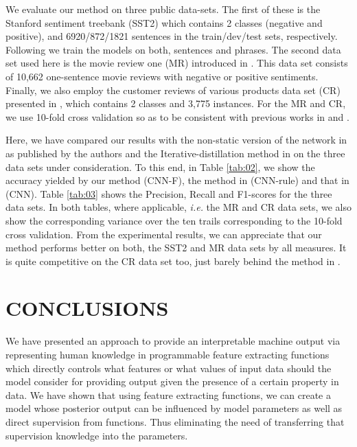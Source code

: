 \documentclass[12pt,a4paper]{article}
\begin{document}
\newpage
We evaluate our method on three public data-sets. The first of these is the Stanford sentiment treebank (SST2) \cite{Socher:2014} which contains 2 classes (negative and positive), and 6920/872/1821 sentences in the train/dev/test sets, respectively. Following \cite{Kim:2014} we train the models on both, sentences and phrases. The second data set used here is the movie review one (MR) introduced in \cite{Pang-Lee:2005}. This data set consists of 10,662 one-sentence movie reviews with negative or positive sentiments. Finally, we also employ the customer reviews of various products data set (CR) presented in \cite{Hu-and-Liu:2004}, which contains 2 classes and 3,775 instances.  For the MR and CR, we use 10-fold cross validation so as to be consistent with previous works in \cite{Hu:2019} and \cite{Kim:2014}.
\vspace{2mm}

Here, we have compared our results with the non-static version of the network in \cite{Kim:2014} as published by the authors and the Iterative-distillation method in \cite{Hu:2019} on the three data sets under consideration. To this end, in Table \ref{tab:02}, we show the accuracy yielded by our method (CNN-F), the method in \cite{Hu:2019} (CNN-rule) and that in \cite{Kim:2014} (CNN). Table \ref{tab:03} shows the Precision, Recall and F1-scores for the three data sets. In both tables, where applicable, {\it i.e.} the MR and CR data sets, we also show the corresponding variance over the ten trails corresponding to the 10-fold cross validation. From the experimental results, we can appreciate that our method performs better on both, the SST2 and MR data sets by all measures. It is quite competitive on the CR data set too, just barely behind the method in \cite{Hu:2019}.
\vspace{2mm}

\newpage
\section{\uppercase{Conclusions}}

We have presented an approach to provide an interpretable
machine output via representing human knowledge in programmable feature extracting functions which directly controls
what features or what values of input data should the model
consider for providing output given the presence of a certain
property in data. We have shown that using feature extracting
functions, we can create a model whose posterior output can be
influenced by model parameters as well as direct supervision
from functions. Thus eliminating the need of transferring that
supervision knowledge into the parameters.
\vspace{2mm}
\end{document}
